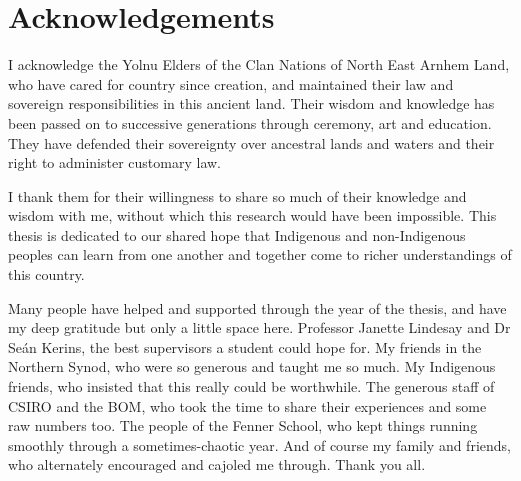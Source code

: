 \chapter{Acknowledgements}

I acknowledge the Yolnu Elders of the Clan Nations of North East Arnhem
Land, who have cared for country since creation, and maintained their
law and sovereign responsibilities in this ancient land.
Their wisdom and knowledge has been passed on to successive generations
through ceremony, art and education.  They have defended their sovereignty
over ancestral lands and waters and their right to administer customary law.

I thank them for their willingness to share so much of their knowledge
and wisdom with me, without which this research would have been impossible.
This thesis is dedicated to our shared hope that Indigenous and non-Indigenous
peoples can learn from one another and together come to richer understandings
of this country.

\vspace{1.5in}

Many people have helped and supported through the year of the thesis,
and have my deep gratitude but only a little space here.  Professor Janette
Lindesay and Dr Seán Kerins, the best supervisors a student could hope for.
My friends in the Northern Synod, who were so generous and taught me so much.
My Indigenous friends, who insisted that this really could be worthwhile.
The generous staff of CSIRO and the BOM, who took the time to share their
experiences and some raw numbers too.  The people of the Fenner School, who
kept things running smoothly through a sometimes-chaotic year.  And of course
my family and friends, who alternately encouraged and cajoled me through.
Thank you all.
